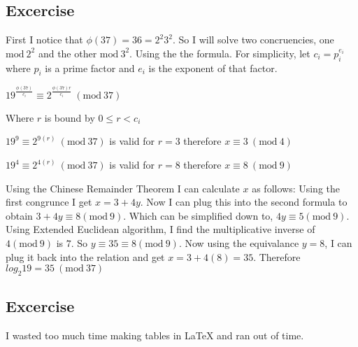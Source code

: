 \documentclass{article}
\begin{document}
\subsection{Excercise}
First I notice that $\phi(37) = 36 = 2^{2} 3^{2}$. So I will solve two concruencies, one $\textrm{mod}\ 2^{2}$ and the other $\textrm{mod}\ 3^{2}$. Using the the formula. For simplicity, let $c_i = p_i^{e_i}$ where $p_i$ is a prime factor and $e_i$ is the exponent of that factor.

$19^{\frac{\phi(37)}{c_i}} \equiv 2^{\frac{\phi(37)r}{c_i}}\ (\textrm{mod}\ 37)$

Where $r$ is bound by $0 \le r < c_i$

$19^{9} \equiv 2^{9(r)}\ (\textrm{mod}\ 37)$ is valid for $r = 3$ therefore $x \equiv 3\ (\textrm{mod}\ 4)$

$19^{4} \equiv 2^{4(r)}\ (\textrm{mod}\ 37)$ is valid for $r = 8$ therefore $x \equiv 8\ (\textrm{mod}\ 9)$

Using the Chinese Remainder Theorem I can calculate $x$ as follows: Using the first congrunce I get $x = 3 + 4y$. Now I can plug this into the second formula to obtain $3 + 4y \equiv 8 (\textrm{mod}\ 9)$. Which can be simplified down to, $4y \equiv 5 (\textrm{mod}\ 9)$. Using Extended Euclidean algorithm, I find the multiplicative inverse of $4 (\textrm{mod}\ 9)$ is $7$. So $y \equiv 35 \equiv 8 (\textrm{mod}\ 9)$. Now using the equivalance $y = 8$, I can plug it back into the relation and get $x = 3 + 4(8) = 35$. Therefore $log_2{19} = 35\ (\textrm{mod}\ 37)$
\subsection{Excercise} I wasted too much time making tables in LaTeX and ran out of time.
\end{document}
